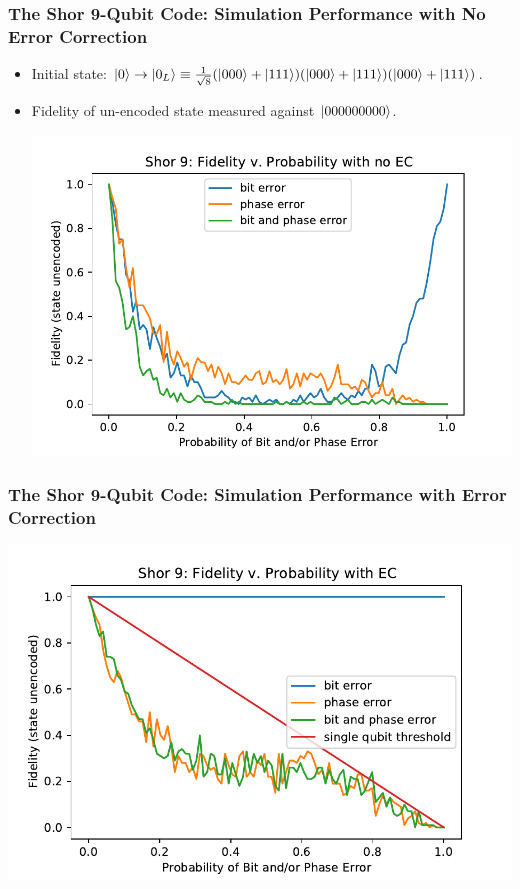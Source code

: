 \documentclass{beamer}
\begin{document}
\begin{frame}
    \frametitle{The Shor 9-Qubit Code: Simulation Performance with No Error Correction}
        \begin{itemize}
            \item Initial state: $\left\vert{0}\right\rangle \rightarrow \left\vert{0_L}\right\rangle \equiv \frac{1}{\sqrt{8}}(\left\vert{000}\right\rangle+\left\vert{111}\right\rangle)(\left\vert{000}\right\rangle+\left\vert{111}\right\rangle)(\left\vert{000}\right\rangle+\left\vert{111}\right\rangle)$.
            \item Fidelity of un-encoded state measured against $\left\vert{000000000}\right\rangle$.
            
            \centering\includegraphics[scale = 0.5]{shor9_nec.pdf}
        \end{itemize}
\end{frame}

\begin{frame}
    \frametitle{The Shor 9-Qubit Code: Simulation Performance with Error Correction}
            \centering\includegraphics[scale = 0.7]{shor9_ec.pdf}
\end{frame}
\end{document}
